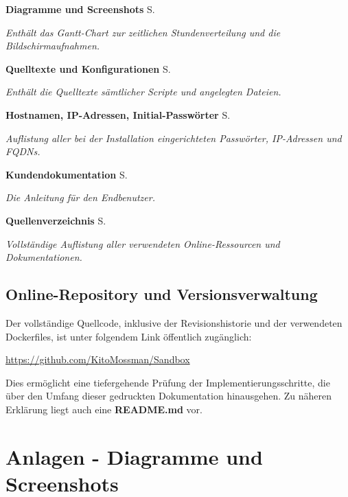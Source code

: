 \documentclass[11pt,
a4paper,
numbers=nonperiod,
footsepline,
oneside,
numbers=noenddot,
bibliography=totoc
]{scrartcl}
\begin{document}
\begin{description}
	\item \textbf{Diagramme und Screenshots} \dotfill S. \pageref{sec:diagramme}
	\item[] \textit{\footnotesize \hspace{0.3cm} Enthält das Gantt-Chart zur zeitlichen Stundenverteilung und die Bildschirmaufnahmen.}
	\item \textbf{Quelltexte und Konfigurationen} \dotfill S. \pageref{sec:quellcode}
	\item[] \textit{\footnotesize \hspace{0.3cm} Enthält die Quelltexte sämtlicher Scripte und angelegten Dateien.}
	\item \textbf{Hostnamen, IP-Adressen, Initial-Passwörter} \dotfill S. \pageref{sec:pass}
	\item[] \textit{\footnotesize \hspace{0.3cm} Auflistung aller bei der Installation eingerichteten Passwörter, IP-Adressen und FQDNs.}
	\item \textbf{Kundendokumentation} \dotfill S. \pageref{sec:kd}
	\item[] \textit{\footnotesize \hspace{0.3cm} Die Anleitung für den Endbenutzer.}
	\item \textbf{Quellenverzeichnis} \dotfill S. \pageref{sec:quellen}
	\item[] \textit{\footnotesize \hspace{0.3cm} Vollständige Auflistung aller verwendeten Online-Ressourcen und Dokumentationen.}
\end{description}

\subsection*{Online-Repository und Versionsverwaltung} \label{github}
Der vollständige Quellcode, inklusive der Revisionshistorie und der verwendeten Dockerfiles, ist unter folgendem Link öffentlich zugänglich:

\begin{center}
	\url{https://github.com/KitoMossman/Sandbox}
\end{center}

Dies ermöglicht eine tiefergehende Prüfung der Implementierungsschritte, die über den Umfang dieser gedruckten Dokumentation hinausgehen. Zu näheren Erklärung liegt auch eine \textbf{README.md} vor.

\newpage
\section{Anlagen - Diagramme und Screenshots}
\label{sec:diagramme}
\end{document}
